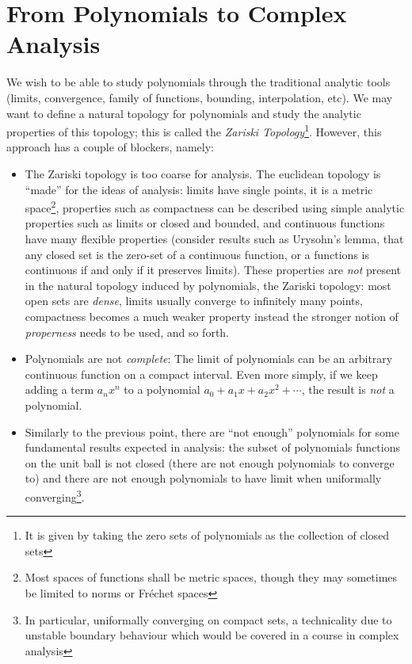 \documentclass[oneside]{article}
\begin{document}
\section{From Polynomials to Complex Analysis}

We wish to be able to study polynomials through the traditional analytic tools (limits, convergence, family of
functions, bounding, interpolation, etc). We may want to define a natural topology for polynomials and study
the analytic properties of this topology; this is called the \emph{Zariski Topology}\footnote{It is given by
taking the zero sets of polynomials as the collection of closed sets}. However, this approach
has a couple of blockers, namely:

\begin{itemize}
  \item The Zariski topology is too coarse for analysis. The euclidean topology is ``made'' for
    the ideas of analysis: limits have single points, it is a metric space\footnote{Most spaces of functions
    shall be metric spaces, though they may sometimes be limited to norms or Fr\'echet spaces}, properties such as
    compactness can be described using simple analytic properties such as limits or closed and bounded, and
    continuous functions have many flexible properties (consider results such as Urysohn's lemma, that any
    closed set is the zero-set of a continuous function, or a functions is continuous if and only if it
    preserves limits). These properties are \emph{not} present in the natural topology induced by polynomials,
    the Zariski topology: most open sets are \emph{dense}, limits usually converge to infinitely many points,
    compactness becomes a much weaker property instead the stronger notion of \emph{properness} needs to be
    used, and so forth.

  \item Polynomials are not \emph{complete}: The limit of polynomials can be an arbitrary continuous function
    on a compact interval. Even more simply, if we keep adding a term $a_nx^n$ to a polynomial $a_0 + a_1x
    + a_2x^2 + \cdots$, the result is \emph{not} a polynomial.
  \item Similarly to the previous point, there are ``not enough'' polynomials for some fundamental results
    expected in analysis: the subset of polynomials functions on the unit ball is not closed (there are not
    enough polynomials to converge to) and there are not enough polynomials to have limit when uniformally
    converging\footnote{In particular, uniformally converging on compact sets, a technicality due to unstable
    boundary behaviour which would be covered in a course in complex analysis}.
\end{itemize}
\end{document}
